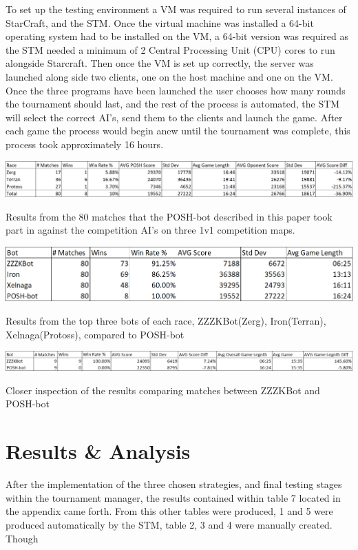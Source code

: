\documentclass[journal]{IEEEtran}
\begin{document}
To set up the testing environment a VM was required to run several instances of StarCraft, and the STM. Once the virtual machine was installed a 64-bit operating system had to be installed on the VM, a 64-bit version was required as the STM needed a minimum of 2 Central Processing Unit (CPU) cores to run alongside Starcraft. Then once the VM is set up correctly, the server was launched along side two clients, one on the host machine and one on the VM. Once the three programs have been launched the user chooses how many rounds the tournament should last, and the rest of the process is automated, the STM will select the correct AI's, send them to the clients and launch the game. After each game the process would begin anew until the tournament was complete, this process took approximately 16 hours. 
\begin{table}[]
	\centering
	\includegraphics[width=\textwidth]{POSH-botWin}
	\caption{Results from the 80 matches that the POSH-bot described in this paper took part in against the competition AI's on three 1v1 competition maps.}
	\label{Table3}
\centering
\includegraphics[width=\textwidth]{TopThreeWin}
\caption{Results from the top three bots of each race, ZZZKBot(Zerg), Iron(Terran), Xelnaga(Protoss), compared to POSH-bot}
\label{Table4}
\centering
\includegraphics[width=\textwidth]{PvsZ}
\caption{Closer inspection of the results comparing matches between ZZZKBot and POSH-bot}
\label{Table5}
\end{table}

\section{Results \& Analysis}
After the implementation of the three chosen strategies, and final testing stages within the tournament manager, the results contained within table 7 located in the appendix came forth. From this other tables were produced, 1 and 5 were produced automatically by the STM, table 2, 3 and 4 were manually created. Though
\end{document}
